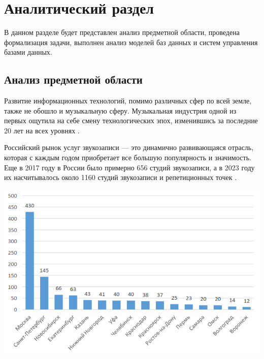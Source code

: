 
\chapter{Аналитический раздел}
В данном разделе будет представлен анализ предметной области, проведена формализация задачи, выполнен анализ моделей баз данных и систем управления базами данных. 
\section{Анализ предметной области}
Развитие информационных технологий, помимо различных сфер по всей земле, также не обошло и музыкальную сферу.
Музыкальная индустрия одной из первых ощутила на себе смену технологических эпох, изменившись за последние 20 лет на всех уровнях \cite{music_and_it}.

Российский рынок услуг звукозаписи --- это динамично развивающаяся отрасль, которая с каждым годом приобретает все большую популярность и значимость.
Еще в 2017 году в России было примерно 656 студий звукозаписи, а в 2023 году их насчитывалось около 1160 студий звукозаписи и репетиционных точек \cite{music_stat}.


\begin{center}
	\centering
	\includegraphics[height=0.3\textheight]{inc/img/stat.png}
	\label{img:stat}
\end{center}


